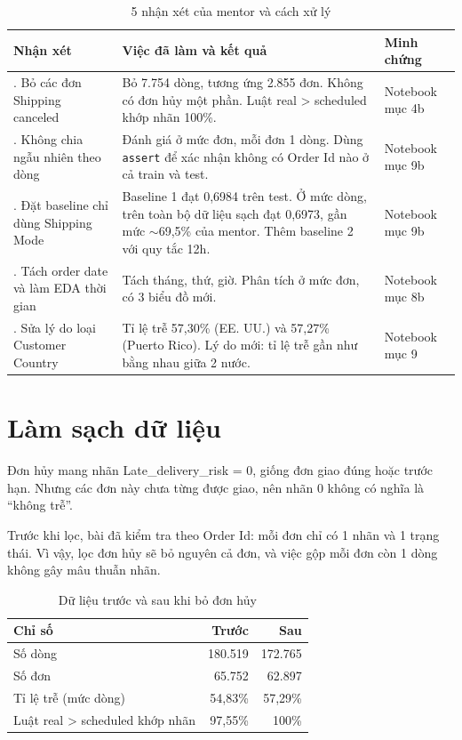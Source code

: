 \documentclass[11pt,a4paper]{article}
\newcommand{\col}[1]{\textsf{#1}}
\begin{document}
\begin{table}[H]\centering\small
\caption{5 nhận xét của mentor và cách xử lý}
\begin{tabularx}{\linewidth}{>{\raggedright\arraybackslash}p{3.7cm}>{\raggedright\arraybackslash}X>{\raggedright\arraybackslash}p{2.1cm}}
\toprule
\textbf{Nhận xét} & \textbf{Việc đã làm và kết quả} & \textbf{Minh chứng} \\
\midrule
1. Bỏ các đơn \col{Shipping canceled} & Bỏ 7.754 dòng, tương ứng 2.855 đơn. Không có đơn hủy một phần. Luật \col{real > scheduled} khớp nhãn 100\%. & Notebook mục 4b \\
2. Không chia ngẫu nhiên theo dòng & Đánh giá ở mức đơn, mỗi đơn 1 dòng. Dùng \texttt{assert} để xác nhận không có \col{Order Id} nào ở cả train và test. & Notebook mục 9b \\
3. Đặt baseline chỉ dùng \col{Shipping Mode} & Baseline 1 đạt 0,6984 trên test. Ở mức dòng, trên toàn bộ dữ liệu sạch đạt 0,6973, gần mức $\sim$69,5\% của mentor. Thêm baseline 2 với quy tắc 12h. & Notebook mục 9b \\
4. Tách \col{order date} và làm EDA thời gian & Tách tháng, thứ, giờ. Phân tích ở mức đơn, có 3 biểu đồ mới. & Notebook mục 8b \\
5. Sửa lý do loại \col{Customer Country} & Tỉ lệ trễ 57,30\% (EE. UU.) và 57,27\% (Puerto Rico). Lý do mới: tỉ lệ trễ gần như bằng nhau giữa 2 nước. & Notebook mục 9 \\
\bottomrule
\end{tabularx}
\end{table}

\section{Làm sạch dữ liệu}

Đơn hủy mang nhãn \col{Late\_delivery\_risk} = 0, giống đơn giao đúng hoặc trước hạn. Nhưng các đơn này chưa từng được giao, nên nhãn 0 không có nghĩa là ``không trễ''.

Trước khi lọc, bài đã kiểm tra theo \col{Order Id}: mỗi đơn chỉ có 1 nhãn và 1 trạng thái. Vì vậy, lọc đơn hủy sẽ bỏ nguyên cả đơn, và việc gộp mỗi đơn còn 1 dòng không gây mâu thuẫn nhãn.

\begin{table}[H]\centering
\caption{Dữ liệu trước và sau khi bỏ đơn hủy}
\begin{tabular}{lrr}
\toprule
\textbf{Chỉ số} & \textbf{Trước} & \textbf{Sau} \\
\midrule
Số dòng & 180.519 & 172.765 \\
Số đơn & 65.752 & 62.897 \\
Tỉ lệ trễ (mức dòng) & 54,83\% & 57,29\% \\
Luật \col{real > scheduled} khớp nhãn & 97,55\% & 100\% \\
\bottomrule
\end{tabular}
\end{table}
\end{document}

